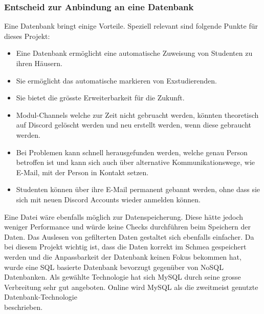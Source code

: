 \documentclass[a4paper, table]{article}
\begin{document}

\subsubsection*{Entscheid zur Anbindung an eine Datenbank}

Eine Datenbank bringt einige Vorteile.
Speziell relevant sind folgende Punkte für dieses Projekt:
\begin{itemize}
    \item Eine Datenbank ermöglicht eine automatische Zuweisung von Studenten zu ihren Häusern.
    \item Sie ermöglicht das automatische markieren von Exstudierenden.
    \item Sie bietet die grösste Erweiterbarkeit für die Zukunft.
    \item Modul-Channels welche zur Zeit nicht gebruacht werden, könnten theoretisch auf Discord gelöscht werden und neu erstellt werden, wenn diese gebraucht werden.
    \item Bei Problemen kann schnell herausgefunden werden, welche genau Person betroffen ist und kann sich auch über alternative Kommunikationswege, wie E-Mail, mit der Person in Kontakt setzen.
    \item Studenten können über ihre E-Mail permanent gebannt werden, ohne dass sie sich mit neuen Discord Accounts wieder anmelden können.
\end{itemize}

Eine Datei wäre ebenfalls möglich zur Datenspeicherung.
Diese hätte jedoch weniger Performance und würde keine Checks durchführen beim Speichern der Daten.
Das Auslesen von gefilterten Daten gestaltet sich ebenfalls einfacher.\autocite{castro_why_2020}
Da bei diesem Projekt wichtig ist, dass die Daten korrekt im Schmea gespeichert werden und die Anpassbarkeit der Datenbank keinen Fokus bekommen hat, wurde eine SQL basierte Datenbank bevorzugt gegenüber von NoSQL Datenbanken.
Als gewählte Technologie hat sich MySQL durch seine grosse Verbreitung sehr gut angeboten.
Online wird MySQL als die zweitmeist genutzte Datenbank-Technologie\\beschrieben.\autocite{noauthor_db-engines_2022}
\end{document}
